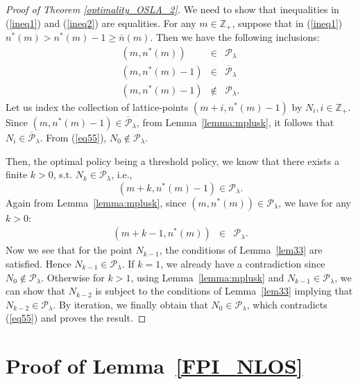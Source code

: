 \documentclass[conference]{IEEEtran}
\begin{document}
\begin{proof}[Proof of Theorem \ref{optimality_OSLA_2}]
We need to show that inequalities in (\ref{ineq1}) and (\ref{ineq2}) are equalities. For any $m\in \mathbb{Z}_+$, suppose that in (\ref{ineq1}) $n^*(m)> n^*(m)-1\geq \bar{n}(m)$. Then we have the following inclusions: 
\begin{eqnarray}
(m,n^*(m)) &\in& \mathcal{P}_\lambda \nonumber \\
(m,n^*(m)-1) &\in& \overline{\mathcal{P}}_\lambda \nonumber \\
(m,n^*(m)-1) &\notin& \mathcal{P}_\lambda. \label{eq55}
\end{eqnarray}
Let us index the collection of lattice-points $(m+i,n^*(m)-\!1)$ by $N_i, i\in \mathbb{Z}_+$. Since $(m,n^*(m)-1) \in \overline{\mathcal{P}}_\lambda$, from Lemma~\ref{lemma:mplusk}, it follows that $N_i\in \overline{\mathcal{P}}_\lambda$. From (\ref{eq55}), $N_0\notin \mathcal{P}_\lambda$.

Then, the optimal policy being a threshold policy, we know that there exists a finite $k>0$, s.t. $N_k\in \mathcal{P}_\lambda$, i.e.,
\begin{equation} \label{eq:Nk}
(m+k,n^*(m)-1) \in \mathcal{P}_\lambda.
\end{equation}
Again from Lemma~\ref{lemma:mplusk}, since $(m,n^*(m))\in \mathcal{P}_\lambda$, we have for any $k>0$:
\begin{eqnarray} \label{eq:Nk2}
(m+k-1,n^*(m)) &\in& \mathcal{P}_\lambda.
\end{eqnarray}
Now we see that for the point $N_{k-1}$, the conditions of Lemma~\ref{lem33} are satisfied. Hence $N_{k-1}\in \mathcal{P}_\lambda$. If $k=1$, we already have a contradiction since $N_0\notin \mathcal{P}_\lambda$. Otherwise for $k>1$, using Lemma~\ref{lemma:mplusk} and $N_{k-1}\in \mathcal{P}_\lambda$, we can show that 
$N_{k-2}$ is subject to the conditions of Lemma~\ref{lem33} implying that $N_{k-2}\in \mathcal{P}_\lambda$. By iteration, we finally obtain that $N_0\in \mathcal{P}_\lambda$, which contradicts (\ref{eq55}) and proves the result. 
\end{proof}





\section{Proof of Lemma~\ref{FPI_NLOS}}
\label{FPI_NLOS_appendix}
\end{document}
